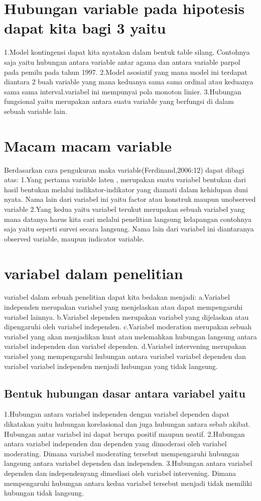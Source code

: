 \section{Hubungan variable pada hipotesis dapat kita bagi 3 yaitu}
1.Model kontingensi dapat kita nyatakan dalam bentuk table silang. Contohnya saja yaitu hubungan antara variable antar agama dan antara 
variable parpol pada pemilu pada tahun 1997. 
2.Model asosiatif yang mana model ini terdapat diantara 2 buah variable yang mana keduanya sama sama ordinal atau keduanya sama sama 
interval.variabel ini mempunyai pola monoton linier.
3.Hubungan fungsional yaitu merupakan antara suatu variable yang berfungsi di dalam sebuah variable lain.

\section{Macam macam variable}
Berdasarkan cara pengukuran maka variable(Ferdinand,2006:12) dapat dibagi atas:
1.Yang pertama variable laten , merupakan suatu variabel bentukan dari hasil bentukan melalui indikator-indikator yang diamati dalam 
kehidupan duni nyata. Nama lain dari variabel ini yaitu factor atau konstruk maupun unobserved variable
2.Yang kedua yaitu variabel terukut merupakan sebuah variabel yang mana datanya harus kita cari melalui penelitian langsung kelapangan 
contohnya saja yaitu seperti survei secara langsung. Nama lain dari variabel ini diantaranya observed variable, maupun indicator 
variable.

\section{variabel dalam penelitian}
variabel dalam sebuah penelitian dapat kita bedakan menjadi:
a.Variabel independen merupakan variabel yang menjelaskan atau dapat mempengaruhi variabel lainnya.
b.Variabel dependen merupakan variabel yang dijelaskan atau dipengaruhi oleh variabel independen.
c.Variabel moderation  merupakan sebuah variabel yang akan menjadikan kuat  atau melemahkan hubungan langsung antara variabel independen 
dan variabel dependen.
d.Variabel intervening merupakan variabel yang mempengaruhi hubungan antara variabel variabel dependen dan variabel variabel independen 
menjadi hubungan yang tidak langsung.

\subsection{Bentuk hubungan dasar antara variabel yaitu}
1.Hubungan antara variabel independen dengan variabel dependen dapat dikatakan yaitu hubungan korelasional dan juga hubungan antara 
sebab akibat. Hubungan antar variabel ini dapat berupa positif maupun neatif.
2.Hubungan antara variabel independen dan dependen yang dimoderasi oleh  variabel moderating. Dimana variabel moderating tersebut 
mempengaruhi hubungan langsung antara variabel dependen dan independen.
3.Hubungan antara variabel dependen dan independenyang dimediasi oleh variabel intervening. Dimana mempengaruhi hubungan antara kedua 
variabel tersebut menjadi tidak memiliki hubungan tidak langsung.

